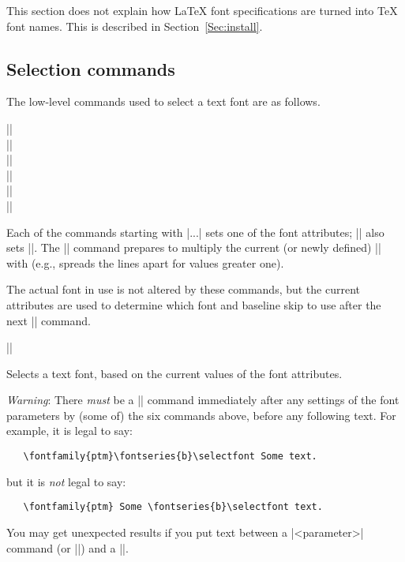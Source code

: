 \documentclass{ltxguide}[1995/11/28]
\begin{document}
This section does not explain how \LaTeX{} font specifications are
turned into \TeX{} font names.  This is described in
Section~\ref{Sec:install}.

\subsection{Selection commands}

The low-level commands used to select a text font are as follows.

\begin{decl}
  |\fontencoding|  \\
  |\fontfamily|   \\
  |\fontseries|  \\
  |\fontshape|  \\
  |\fontsize|   \\
  |\linespread| 
\end{decl}

Each of the commands starting with |\font...| sets one of the font
attributes; |\fontsize| also sets |\baselineskip|. The |\linespread|
command prepares to multiply the current (or newly defined)
|\baselineskip| with  (e.g., spreads the lines apart for
values greater one).

The actual font in use is not altered by these commands, but the
current attributes are used to determine which font and baseline skip
to use after the next |\selectfont| command.

\begin{decl}
  |\selectfont|
\end{decl}
Selects a text font, based on the current values of the font attributes.

\emph{Warning}: There \emph{must} be a |\selectfont| command immediately
after any settings of the font parameters by (some of) the six commands
above, before any following text.  For example, it is legal to say:
\begin{verbatim}
   \fontfamily{ptm}\fontseries{b}\selectfont Some text.
\end{verbatim}
but it is \emph{not} legal to say:
\begin{verbatim}
   \fontfamily{ptm} Some \fontseries{b}\selectfont text.
\end{verbatim}
You may get unexpected results if you put text between a
|\font<parameter>| command (or |\linespread|) and a |\selectfont|.
\end{document}
